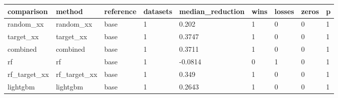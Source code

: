 \begin{tabular}{lllllllll}
\toprule
comparison & method & reference & datasets & median\_reduction & wins & losses & zeros & p \\
\midrule
random\_xx & random\_xx & base & 1 & 0.202 & 1 & 0 & 0 & 1 \\
target\_xx & target\_xx & base & 1 & 0.3747 & 1 & 0 & 0 & 1 \\
combined & combined & base & 1 & 0.3711 & 1 & 0 & 0 & 1 \\
rf & rf & base & 1 & -0.0814 & 0 & 1 & 0 & 1 \\
rf\_target\_xx & rf\_target\_xx & base & 1 & 0.349 & 1 & 0 & 0 & 1 \\
lightgbm & lightgbm & base & 1 & 0.2643 & 1 & 0 & 0 & 1 \\
\bottomrule
\end{tabular}
